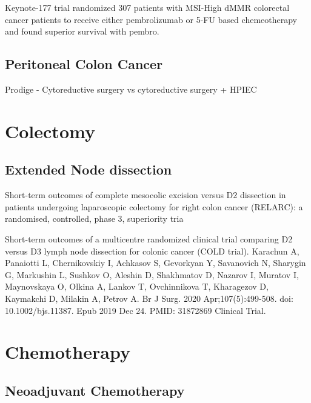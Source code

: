 \documentclass[
]{book}
\begin{document}
Keynote-177 trial \citep{andre2207} randomized 307 patients with MSI-High dMMR colorectal cancer patients to receive either pembrolizumab or 5-FU based chemeotherapy and found superior survival with pembro.

\hypertarget{peritoneal-colon-cancer}{%
\section{Peritoneal Colon Cancer}\label{peritoneal-colon-cancer}}

Prodige - Cytoreductive surgery vs cytoreductive surgery + HPIEC

\hypertarget{colectomy-1}{%
\chapter{Colectomy}\label{colectomy-1}}

\hypertarget{extended-node-dissection}{%
\section{Extended Node dissection}\label{extended-node-dissection}}

Short-term outcomes of complete mesocolic excision versus D2 dissection in patients undergoing laparoscopic colectomy for right colon cancer (RELARC): a randomised, controlled, phase 3, superiority tria

Short-term outcomes of a multicentre randomized clinical trial comparing D2 versus D3 lymph node dissection for colonic cancer (COLD trial).
Karachun A, Panaiotti L, Chernikovskiy I, Achkasov S, Gevorkyan Y, Savanovich N, Sharygin G, Markushin L, Sushkov O, Aleshin D, Shakhmatov D, Nazarov I, Muratov I, Maynovskaya O, Olkina A, Lankov T, Ovchinnikova T, Kharagezov D, Kaymakchi D, Milakin A, Petrov A.
Br J Surg. 2020 Apr;107(5):499-508. doi: 10.1002/bjs.11387. Epub 2019 Dec 24.
PMID: 31872869 Clinical Trial.

\hypertarget{chemotherapy}{%
\chapter{Chemotherapy}\label{chemotherapy}}

\hypertarget{neoadjuvant-chemotherapy}{%
\section{Neoadjuvant Chemotherapy}\label{neoadjuvant-chemotherapy}}
\end{document}
